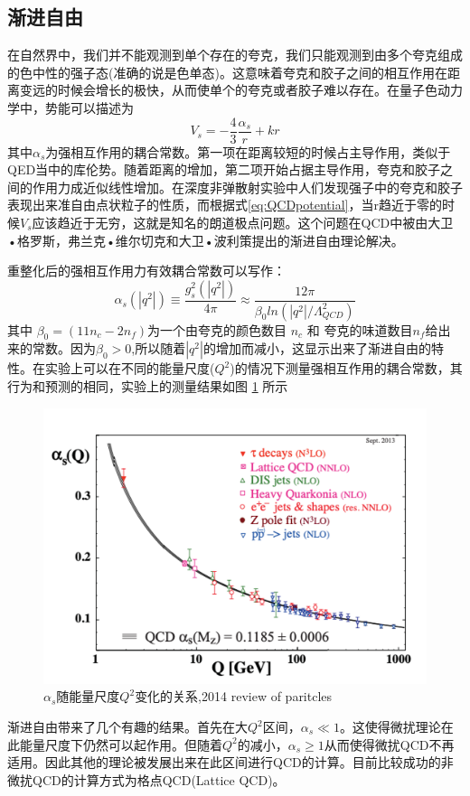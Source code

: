 \subsection{渐进自由}
在自然界中，我们并不能观测到单个存在的夸克，我们只能观测到由多个夸克组成的色中性的强子态(准确的说是色单态)。这意味着夸克和胶子之间的相互作用在距离变远的时候会增长的极快，从而使单个的夸克或者胶子难以存在。在量子色动力学中，势能可以描述为
\begin{equation}
    V_s = -\frac{4}{3}\frac{\alpha_{s}}{r} + kr
    \label{eq:QCDpotential}
\end{equation}
其中$\alpha_{s}$为强相互作用的耦合常数。第一项在距离较短的时候占主导作用，类似于QED当中的库伦势。随着距离的增加，第二项开始占据主导作用，夸克和胶子之间的作用力成近似线性增加。在深度非弹散射实验中人们发现强子中的夸克和胶子表现出来准自由点状粒子的性质，而根据式\ref{eq:QCDpotential}，当r趋近于零的时候$V_s$应该趋近于无穷，这就是知名的朗道极点问题。这个问题在QCD中被由大卫•格罗斯，弗兰克•维尔切克和大卫•波利策提出的渐进自由理论解决。

重整化后的强相互作用力有效耦合常数可以写作：
\begin{equation}
    \alpha_{s}(|q^2|) \equiv \frac{g_s^2(|q^2|)}{4\pi} \approx \frac{12\pi}{\beta_0 ln(|q^2|/\Lambda_{QCD}^2)}
\end{equation}
其中 $\beta_0 = (11n_c-2n_f)$为一个由夸克的颜色数目 $n_c$ 和 夸克的味道数目$n_f$给出来的常数。因为$\beta_0 > 0$,所以随着$|q^2|$的增加而减小，这显示出来了渐进自由的特性。在实验上可以在不同的能量尺度($Q^2$)的情况下测量强相互作用的耦合常数，其行为和预测的相同，实验上的测量结果如图 \ref{fig:Alpha_S} 所示
\begin{figure}[htb]
    \begin{center}
    \includegraphics[width=\textwidth,clip]{figures/Chapter1/Alpha_s.png}
    \end{center}
    \caption[$\alpha_s$随能量尺度$Q^2$变化的关系]{$\alpha_s$随能量尺度$Q^2$变化的关系,2014 review of paritcles}
    \label{fig:Alpha_S}
\end{figure}

渐进自由带来了几个有趣的结果。首先在大$Q^2$区间，$\alpha_s \ll 1$。这使得微扰理论在此能量尺度下仍然可以起作用。但随着$Q^2$的减小，$\alpha_s \geq 1$从而使得微扰QCD不再适用。因此其他的理论被发展出来在此区间进行QCD的计算。目前比较成功的非微扰QCD的计算方式为格点QCD(Lattice QCD)。